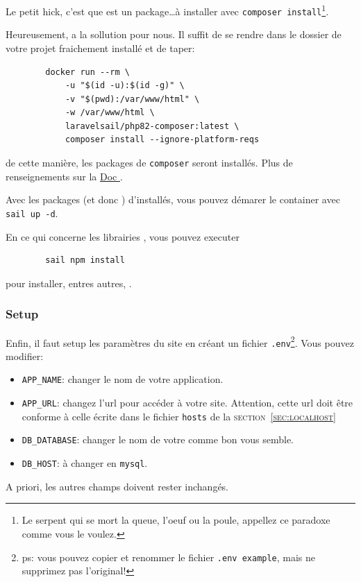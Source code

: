     Le petit hick, c'est que \laravelsail{} est un package\ldots à installer avec \verb|composer install|\footnote{Le serpent qui se mort la queue, l'oeuf ou la poule, appellez ce paradoxe comme vous le voulez.}. 

    Heureusement, \laravel{} a la sollution pour nous. Il suffit de se rendre dans le dossier de votre projet fraichement installé et de taper:
    \begin{lstlisting}
        docker run --rm \
            -u "$(id -u):$(id -g)" \
            -v "$(pwd):/var/www/html" \
            -w /var/www/html sail/php82-composer:latest \
            composer install --ignore-platform-reqs
    \end{lstlisting}

    de cette manière, les packages de \texttt{composer} seront installés. Plus de renseignements sur la \href{https://laravel.com/docs/10.x/sail#installing-composer-dependencies-for-existing-projects}{Doc \laravel}.
    
    Avec les packages (et donc \laravelsail{}) d'installés, vous pouvez démarer le container avec \verb|sail up -d|.

    En ce qui concerne les librairies \js{}, vous pouvez executer 
    \begin{lstlisting}
        sail npm install
    \end{lstlisting}
    pour installer, entres autres, \vite.

    \subsubsection[Setup]{Setup}
    Enfin, il faut setup les paramètres du site en créant un fichier \verb|.env|\footnote{ps: vous pouvez copier et renommer le fichier \verb|.env example|, mais ne supprimez pas l'original!}. Vous pouvez modifier:

    \begin{itemize}
        \item \verb|APP_NAME|: changer le nom de votre application.
        \item \verb|APP_URL|: changez l'url pour accéder à votre site. Attention, cette url doit être conforme à celle écrite dans le fichier \verb|hosts| de la \textsc{section~\ref{sec:localhost}}
        \item \verb|DB_DATABASE|: changer le nom de votre \db{} comme bon vous semble.
        \item \verb|DB_HOST|: à changer en \verb|mysql|.
    \end{itemize}
    A priori, les autres champs doivent rester inchangés.

